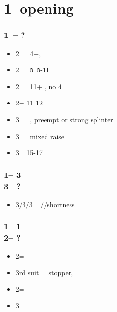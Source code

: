 \documentclass[12pt, a4paper]{report}
\begin{document}
{    \section*{\colorbox{blue!30}{1\diams\ opening}}
     {

        \subsubsection*{1\diams\ -- ?}
        \begin{itemize}
            \item 2\diams\ = 4+\diams, \invp
            \item 2\hearts\ = 5\hearts\ 5-11
            \item 2\spades\ = 11+ \bal, no 4\major
            \item 2\nt = 11-12 \bal
            \item 3\clubs\ = \diams, preempt or strong splinter
            \item 3\diams\ = mixed raise
            \item 3\nt = 15-17 \bal
        \end{itemize}

        \subsubsection*{1\diams -- 3\clubs\\
                        3\diams -- ?}
        \begin{itemize}
            \item 3\hearts/3\spades/3\nt = \hearts/\spades/\clubs shortness
        \end{itemize}

        \subsubsection*{1\diams -- 1\major\\
                        2\diams -- ?}
        \begin{itemize}
            \item 2\major = \nf
            \item 3rd suit = stopper, \gf
            \item 2\nt = \gf
            \item 3\diams = \inv
        \end{itemize}

}}
\end{document}
